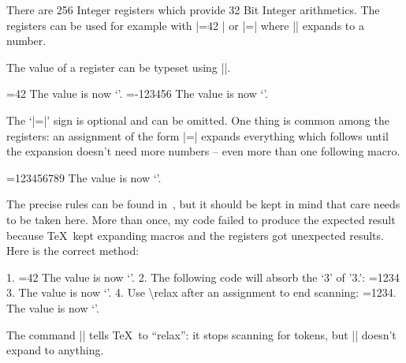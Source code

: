 \documentclass[a4paper]{ltxdoc}
\begin{document}
\label{sec:variables}
\begin{command}{\count{}}
	There are 256 Integer registers which provide 32 Bit Integer arithmetics. The registers can be used for example with |=42 | or |=\macro | where |\macro| expands to a number.

	The value of a register can be typeset using |\the|.
\begin{codeexample}[]
=42
The value is now `\the{}'. 
\def\macro{-123456}
=\macro 
The value is now `\the{}'.
\end{codeexample}
	
	The `|=|' sign is optional and can be omitted. One thing is common among the registers: an assignment of the form |=|\meta{$\cdots$} expands everything which follows until the expansion doesn't need more numbers -- even more than one following macro.
\begin{codeexample}[]
\def\firstmacro{123}
\def\secondmacro{456}
\def\thirdmacro{789}
=\firstmacro\secondmacro\thirdmacro
The value is now `\the{}'.
\end{codeexample}
 The precise rules can be found in~\cite{texbook}, but it should be kept in mind that care needs to be taken here. More than once, my code failed to produce the expected result because \TeX\ kept expanding macros and the registers got unexpected results. Here is the correct method:
\begin{codeexample}[]
1. =42 %
The value is now `\the{}'.
2. The following code will absorb the `3' of '3.':
\def\macro{1234}
=\macro %
3. The value is now `\the{}'.
4. Use \textbackslash relax after an assignment to end scanning:
=\macro{}. The value is now `\the{}'.
\end{codeexample}
	The command |\relax| tells \TeX\ to ``relax'': it stops scanning for tokens, but |\relax| doesn't expand to anything.
\end{command}
\end{document}
